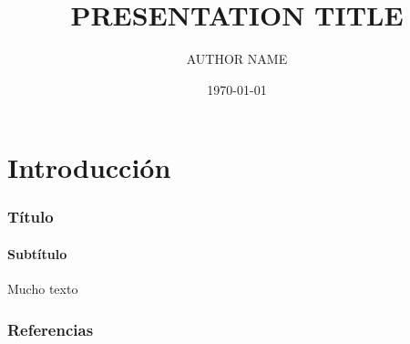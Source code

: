 \documentclass[aspectratio=1610,multi,rgb]{beamer}
\title{PRESENTATION TITLE}
\author{AUTHOR NAME}
\institute{INSTITUTE}
\date{\today}
\begin{document}
\nocite{*} %

\begin{frame}\maketitle\end{frame}
\begin{frame}\tableofcontents\end{frame}

\section{Introducción}\label{Introducción}
\titleframe{\label{Introducción}}

\begin{frame}[c]
	\frametitle{Título}
	\framesubtitle{Subtítulo}

	Mucho texto
	
\end{frame}

\begin{frame}[c]
	\frametitle{Referencias}
	\printbibliography
\end{frame}
\end{document}

